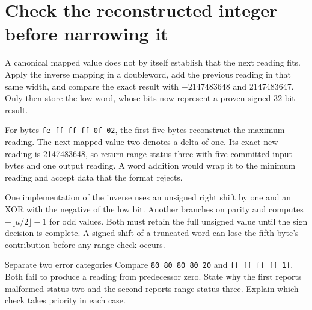 \section{Check the reconstructed integer before narrowing it}
A canonical mapped value does not by itself establish that the next reading fits.
Apply the inverse mapping in a doubleword, add the previous reading in that same width,
and compare the exact result with \(-2147483648\) and 2147483647. Only then store the
low word, whose bits now represent a proven signed 32-bit result.

For bytes \texttt{fe ff ff ff 0f 02}, the first five bytes reconstruct the maximum
reading. The next mapped value two denotes a delta of one. Its exact new reading is
2147483648, so return range status three with five committed input bytes and one
output reading. A word addition would wrap it to the minimum reading and accept data
that the format rejects.

One implementation of the inverse uses an unsigned right shift by one and an XOR with
the negative of the low bit. Another branches on parity and computes
\(-\lfloor u/2\rfloor-1\) for odd values. Both must retain the full unsigned value
until the sign decision is complete. A signed shift of a truncated word can lose the
fifth byte's contribution before any range check occurs.

\begin{MARSExercise}{Separate two error categories}
Compare \texttt{80 80 80 80 20} and \texttt{ff ff ff ff 1f}. Both fail to produce a
reading from predecessor zero. State why the first reports malformed status two and
the second reports range status three. Explain which check takes priority in each case.
\end{MARSExercise}
